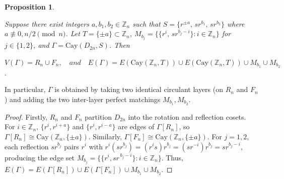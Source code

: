 \documentclass[12pt,reqno,a4paper]{amsart}
\theoremstyle{definition}
\newtheorem{prop}[defn]{Proposition}
\begin{document}
\begin{prop}\label{Proposition 5.1}
{\em
Suppose there exist integers $a,b_1,b_2 \in \mathbb{Z}_n$ such that
$S = \{ r^{\pm a},\, sr^{b_1},\, sr^{b_2} \}$ where $a\not\equiv 0, n/2 \pmod n$. 
Let $T=\{\pm a\} \subset \mathbb{Z}_n$, 
$M_{b_j} = \bigl\{ \{r^i,\, sr^{b_j-i}\} : i \in \mathbb{Z}_n \bigr\}$ for $j\in\{1,2\}$, and $\Gamma = \mathrm{Cay}(D_{2n},S)$.
Then 
\begin{center} 
    $V(\Gamma)=R_{n}\cup F_{n},\quad and \quad E(\Gamma) = E(\mathrm{Cay}(\mathbb{Z}_n,T)) \cup E(\mathrm{Cay}(\mathbb{Z}_n,T)) \cup M_{b_1} \cup M_{b_2}$.
\end{center}

In particular, $\Gamma$ is obtained by taking two identical circulant layers (on $R_{n}$ and $F_{n}$) and adding the two inter-layer perfect matchings $M_{b_1},M_{b_2}$.
}
\end{prop}

\begin{proof}
Firstly, $R_{n}$ and $F_{n}$ partition $D_{2n}$ into the rotation and reflection cosets. 
For $i \in \mathbb{Z}_n$,
$\{ r^i, r^{i+a} \}$ and $\{ r^i, r^{i-a}\}$
are edges of $\Gamma[R_{n}]$, so $\Gamma[R_{n}] \cong \mathrm{Cay}(\mathbb{Z}_n, \{\pm a\})$. Similarly, $\Gamma[F_{n}]\cong \mathrm{Cay}(\mathbb{Z}_n, \{\pm a\})$.
For $j=1,2$, each reflection $sr^{b_j}$ pairs $r^i$ with 
$r^{i}(sr^{b_j})=(r^{i}s)r^{b_{j}}=(sr^{-i})r^{b_{j}}=sr^{b_{j}-i}$,
producing the edge set
$M_{b_j} = \{ \{ r^i, sr^{\,b_j-i}\} : i \in \mathbb{Z}_n\}$.
Thus,
$E(\Gamma) = E(\Gamma[R_{n}]) \cup E(\Gamma[F_{n}]) \cup M_{b_1} \cup M_{b_2}$.
 \end{proof}
\end{document}

